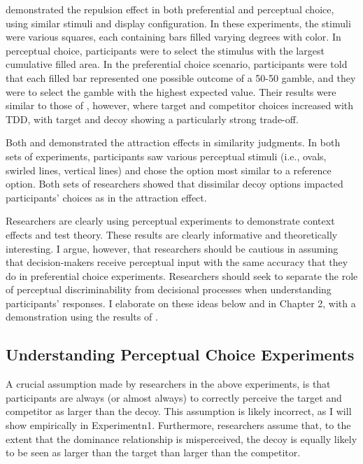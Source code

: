\textcite{spektorRepulsionEffectPreferential2022} demonstrated the repulsion effect in both preferential and perceptual choice, using similar stimuli and display configuration. In these experiments, the stimuli were various squares, each containing bars filled varying degrees with color. In perceptual choice, participants were to select the stimulus with the largest cumulative filled area. In the preferential choice scenario, participants were told that each filled bar represented one possible outcome of a 50-50 gamble, and they were to select the gamble with the highest expected value. Their results were similar to those of \textcite{spektorWhenGoodLooks2018b}, however, where target and competitor choices increased with TDD, with target and decoy showing a particularly strong trade-off.

Both \textcite{choplinComparisoninducedDecoyEffects2005b} and \textcite{yearsleyContextEffectsSimilarity2022} demonstrated the attraction effects in similarity judgments. In both sets of experiments, participants saw various perceptual stimuli (i.e., ovals, swirled lines, vertical lines) and chose the option most similar to a reference option. Both sets of researchers showed that dissimilar decoy options impacted participants' choices as in the attraction effect.

Researchers are clearly using perceptual experiments to demonstrate context effects and test theory. These results are clearly informative and theoretically interesting. I argue, however, that researchers should be cautious in assuming that decision-makers receive perceptual input with the same accuracy that they do in preferential choice experiments. Researchers should seek to separate the role of perceptual discriminability from decisional processes when understanding participants' responses. I elaborate on these ideas below and in Chapter 2, with a demonstration using the results of \textcite{spektorWhenGoodLooks2018b}.

\subsection{Understanding Perceptual Choice Experiments}

A crucial assumption made by researchers in the above experiments, is that participants are always (or almost always) to correctly perceive the target and competitor as larger than the decoy. This assumption is likely incorrect, as I will show empirically in Experimentn1. Furthermore, researchers assume that, to the extent that the dominance relationship is misperceived, the decoy is equally likely to be seen as larger than the target than larger than the competitor. 

